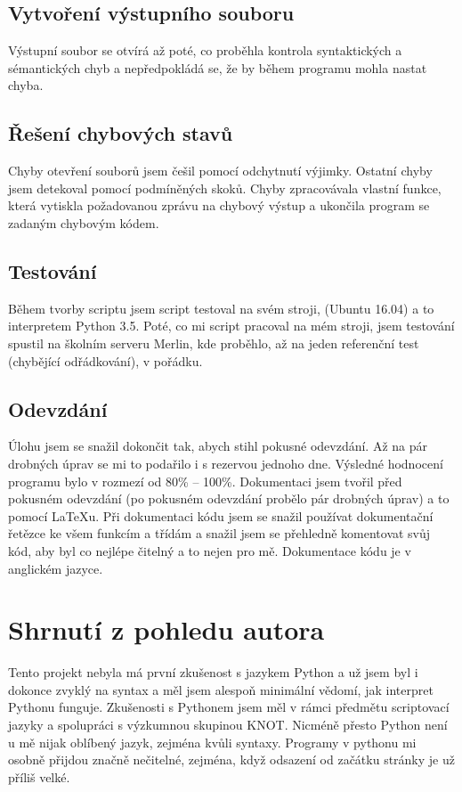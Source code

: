 \documentclass[a4paper, 10pt]{article}
\begin{document}
        \subsection{Vytvoření výstupního souboru}
            Výstupní soubor se otvírá až poté, co proběhla kontrola syntaktických
            a sémantických chyb a nepředpokládá se, že by během programu mohla nastat
            chyba.
        \subsection{Řešení chybových stavů}
            Chyby otevření souborů jsem češil pomocí odchytnutí výjimky. Ostatní
            chyby jsem detekoval pomocí podmíněných skoků. Chyby zpracovávala
            vlastní funkce, která vytiskla požadovanou zprávu na chybový výstup
            a ukončila program se zadaným chybovým kódem.
        \subsection{Testování}
            Během tvorby scriptu jsem script testoval na svém stroji, (Ubuntu 16.04)
            a to interpretem Python 3.5. Poté, co mi script pracoval na mém stroji,
            jsem testování spustil na školním serveru Merlin, kde proběhlo, až na
            jeden referenční test (chybějící odřádkování), v pořádku.
        \subsection{Odevzdání}
            Úlohu jsem se snažil dokončit tak, abych stihl pokusné odevzdání.
            Až na pár drobných úprav se mi to podařilo i s rezervou jednoho dne.
            Výsledné hodnocení programu bylo v rozmezí od 80\% -- 100\%.
            Dokumentaci jsem tvořil před pokusném odevzdání (po pokusném odevzdání
            probělo pár drobných úprav) a to pomocí \LaTeX u. Při dokumentaci
            kódu jsem se snažil používat dokumentační řetězce ke všem funkcím a
            třídám a snažil jsem se přehledně komentovat svůj kód, aby byl co
            nejlépe čitelný a to nejen pro mě. Dokumentace kódu je v anglickém
            jazyce.

    \section{Shrnutí z pohledu autora}
        Tento projekt nebyla má první zkušenost s jazykem Python a už jsem byl
        i dokonce zvyklý na syntax a měl jsem alespoň minimální vědomí, jak
        interpret Pythonu funguje. Zkušenosti s Pythonem jsem měl v rámci předmětu
        scriptovací jazyky a spolupráci s výzkumnou skupinou KNOT. Nicméně přesto
        Python není u mě nijak oblíbený jazyk, zejména kvůli syntaxy. Programy v
        pythonu mi osobně přijdou značně nečitelné, zejména, když odsazení
        od začátku stránky je už příliš velké.
\end{document}
